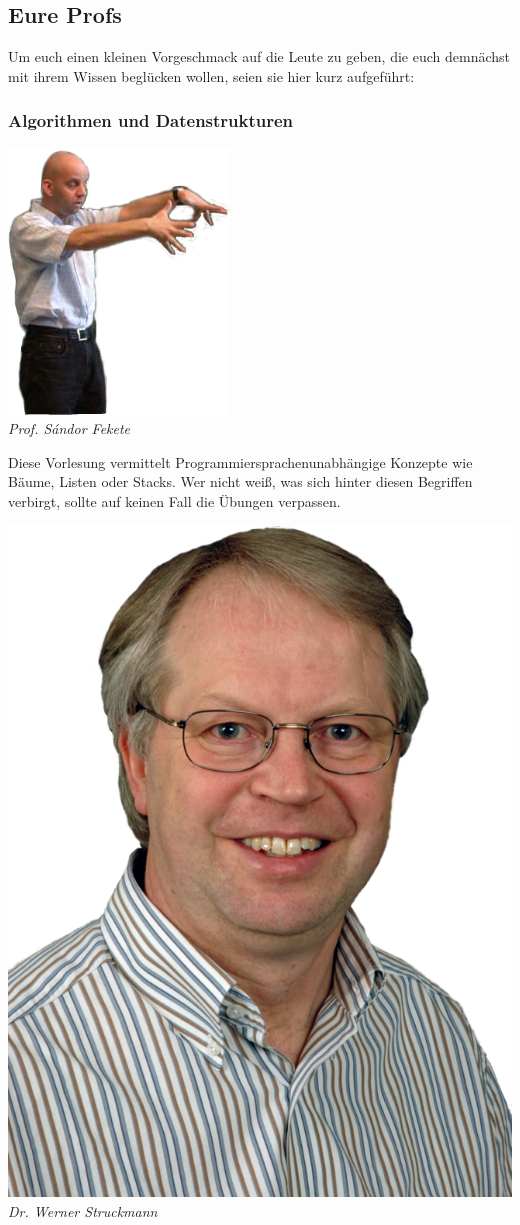 \subsection{Eure Profs}
Um euch einen kleinen Vorgeschmack auf die Leute zu geben, die euch demnächst mit ihrem Wissen beglücken wollen, seien sie hier kurz aufgeführt:
\subsubsection{Algorithmen und Datenstrukturen}


\includegraphics[width=0.7\linewidth]{bilder/dozenten/fekete_frei.png}\\
\textit{Prof. S\'andor Fekete}

Diese Vorlesung vermittelt Programmiersprachenunabhängige Konzepte wie Bäume, Listen oder Stacks. Wer nicht weiß, was sich hinter diesen Begriffen verbirgt, sollte auf keinen Fall die Übungen verpassen.

\includegraphics[width=0.6\linewidth]{bilder/dozenten/struck.png}\\
\textit{Dr. Werner Struckmann}

